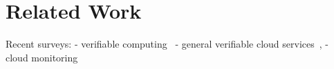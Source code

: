 \section{Related Work} \label{sect:related-work}


Recent surveys:
- verifiable computing~\cite{WB13} 
- general verifiable cloud services~\cite{BCC+13}, 
- cloud monitoring~\cite{ABD+13,FEH+14}
